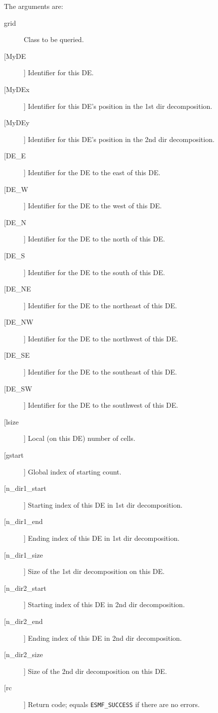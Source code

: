        The arguments are:
       \begin{description}
       \item[grid]
            Class to be queried.
       \item[[MyDE]]
            Identifier for this DE.
       \item[[MyDEx]]
            Identifier for this DE's position in the 1st dir decomposition.
       \item[[MyDEy]]
            Identifier for this DE's position in the 2nd dir decomposition.
       \item[[DE\_E]]
            Identifier for the DE to the east of this DE.
       \item[[DE\_W]]
            Identifier for the DE to the west of this DE.
       \item[[DE\_N]]
            Identifier for the DE to the north of this DE.
       \item[[DE\_S]]
            Identifier for the DE to the south of this DE.
       \item[[DE\_NE]]
            Identifier for the DE to the northeast of this DE.
       \item[[DE\_NW]]
            Identifier for the DE to the northwest of this DE.
       \item[[DE\_SE]]
            Identifier for the DE to the southeast of this DE.
       \item[[DE\_SW]]
            Identifier for the DE to the southwest of this DE.
       \item[[lsize]]
            Local (on this DE) number of cells.
       \item[[gstart]]
            Global index of starting count.
       \item[[n\_dir1\_start]]
            Starting index of this DE in 1st dir decomposition.
       \item[[n\_dir1\_end]]
            Ending index of this DE in 1st dir decomposition.
       \item[[n\_dir1\_size]]
            Size of the 1st dir decomposition on this DE.
       \item[[n\_dir2\_start]]
            Starting index of this DE in 2nd dir decomposition.
       \item[[n\_dir2\_end]]
            Ending index of this DE in 2nd dir decomposition.
       \item[[n\_dir2\_size]]
            Size of the 2nd dir decomposition on this DE.
       \item[[rc]]
            Return code; equals {\tt ESMF\_SUCCESS} if there are no errors.
       \end{description}
   
